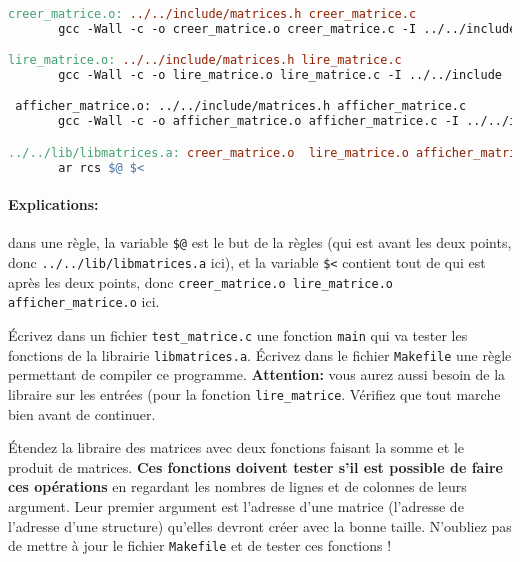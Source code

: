 \begin{lstlisting}[language=make]

creer_matrice.o: ../../include/matrices.h creer_matrice.c
       gcc -Wall -c -o creer_matrice.o creer_matrice.c -I ../../include

lire_matrice.o: ../../include/matrices.h lire_matrice.c
       gcc -Wall -c -o lire_matrice.o lire_matrice.c -I ../../include

 afficher_matrice.o: ../../include/matrices.h afficher_matrice.c
       gcc -Wall -c -o afficher_matrice.o afficher_matrice.c -I ../../include

../../lib/libmatrices.a: creer_matrice.o  lire_matrice.o afficher_matrice.o
       ar rcs $@ $<
\end{lstlisting}

\paragraph{Explications:} dans une règle, la variable \texttt{\$@} est
le but de la règles (qui est avant les deux points, donc
\texttt{../../lib/libmatrices.a} ici), et la variable \texttt{\$<}
contient tout de qui est après les deux points, donc
\texttt{creer\_matrice.o lire\_matrice.o afficher\_matrice.o} ici. 

\question Écrivez dans un fichier \texttt{test\_matrice.c} une
fonction \texttt{main} qui va tester les fonctions de la librairie
\texttt{libmatrices.a}. Écrivez dans le fichier \texttt{Makefile} une
règle permettant de compiler ce programme. \textbf{Attention:} vous
aurez aussi besoin de la libraire sur les entrées (pour la fonction
\texttt{lire\_matrice}. Vérifiez que tout marche bien avant de continuer.


\question Étendez la libraire des matrices avec deux fonctions faisant
la somme et le produit de matrices. \textbf{Ces fonctions doivent
  tester s'il est possible de faire ces opérations} en regardant les
nombres de lignes et de colonnes de leurs argument. Leur premier
argument est l'adresse d'une matrice (l'adresse de l'adresse d'une
structure) qu'elles devront créer avec la bonne taille. N'oubliez pas
de mettre à jour le fichier \texttt{Makefile} et de tester ces
fonctions !

